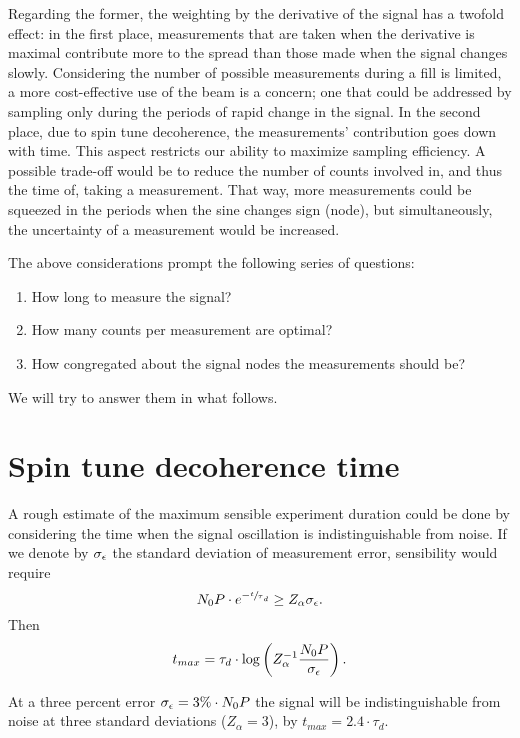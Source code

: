 \documentclass{article}
\begin{document}
Regarding the former, the weighting by the derivative of the signal has a twofold effect: in the first place, measurements that are taken when the derivative is maximal contribute more to the spread than those made when the signal changes slowly. Considering the number of possible measurements during a fill is limited, a more cost-effective use of the beam is a concern; one that could be addressed by sampling only during the periods of rapid change in the signal. In the second place, due to spin tune decoherence, the measurements' contribution goes down with time. This aspect restricts our ability to maximize sampling efficiency. A possible trade-off would be to reduce the number of counts involved in, and thus the time of, taking a measurement. That way, more measurements could be squeezed in the periods when the sine changes sign (node), but simultaneously, the uncertainty of a measurement would be increased. 

The above considerations prompt the following series of questions:
\begin{enumerate}
	\item How long to measure the signal?
	\item How many counts per measurement are optimal?
	\item How congregated about the signal nodes the measurements should be?
\end{enumerate}
We will try to answer them in what follows.

\section{Spin tune decoherence time}
A rough estimate of the maximum sensible experiment duration could be done by considering the time when the signal oscillation is indistinguishable from noise. If we denote by $\SD{\meas}$ the standard deviation of measurement error, sensibility would require
\[
N_0P\cdot e^{-\sfrac t\tau_d} \geq Z_\alpha \SD{\meas}.
\]
Then 
\[
t_{max} = \tau_d\cdot \log\bkt{Z_\alpha^{-1}\frac{N_0P}{\SD{\meas}}}.
\]

At a three percent error $\SD{\meas} = 3\%\cdot N_0P$ the signal will be indistinguishable from noise at three standard deviations ($Z_\alpha = 3$), by $t_{max} = 2.4\cdot \tau_d$. 
\end{document}

